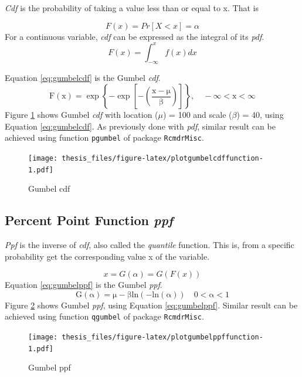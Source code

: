 \documentclass[12pt,oneside]{reedthesis}
\begin{document}
\emph{Cdf} is the probability of taking a value less than or equal to x. That is

\[
F(x) = Pr[X < x] = \alpha
\]
For a continuous variable, \emph{cdf} can be expressed as the integral of its \emph{pdf}.
\[
F(x) = \int_{-\infty}^x f(x)dx
\]

Equation \eqref{eq:gumbelcdf} is the Gumbel \emph{cdf}.
\begin{equation}
\mathrm{
        F(x) = \exp\left\{-\exp\left[-\left(\frac{x-\mu}{\beta}\right)\right]\right\}, 
        \quad -\infty < x < \infty
        }
  \label{eq:gumbelcdf}
\end{equation}
Figure \ref{fig:plotgumbelcdffunction} shows Gumbel \emph{cdf} with location (\(\mu\)) = 100 and scale (\(\beta\)) = 40, using Equation \eqref{eq:gumbelcdf}. As previously done with \emph{pdf}, similar result can be achieved using function \texttt{pgumbel} of package \texttt{RcmdrMisc}.

\footnotesize
\begin{figure}
\centering
\texttt{[image: thesis\_files/figure-latex/plotgumbelcdffunction-1.pdf]}
\caption{\label{fig:plotgumbelcdffunction}Gumbel cdf}
\end{figure}
\normalsize

\hypertarget{percent-point-function-ppf}{%
\subsection{\texorpdfstring{Percent Point Function \emph{ppf}}{Percent Point Function ppf}}\label{percent-point-function-ppf}}

\emph{Ppf} is the inverse of \emph{cdf}, also called the \emph{quantile} function. This is, from a specific probability get the corresponding value x of the variable.

\[
x = G(\alpha) = G(F(x))
\]
Equation \eqref{eq:gumbelppf} is the Gumbel \emph{ppf}.
\begin{equation}
\mathrm{
        G(\alpha) = \mu-\beta ln(-ln(\alpha))
        \quad 0 < \alpha < 1
        }
  \label{eq:gumbelppf}
\end{equation}
Figure \ref{fig:plotgumbelppffunction} shows Gumbel \emph{ppf}, using Equation \eqref{eq:gumbelppf}. Similar result can be achieved using function \texttt{qgumbel} of package \texttt{RcmdrMisc}.

\footnotesize
\begin{figure}
\centering
\texttt{[image: thesis\_files/figure-latex/plotgumbelppffunction-1.pdf]}
\caption{\label{fig:plotgumbelppffunction}Gumbel ppf}
\end{figure}
\normalsize
\end{document}
